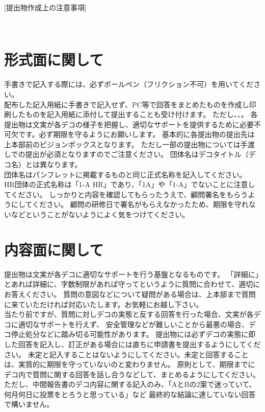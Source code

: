 \newpage
\pagestyle{booklet}
[提出物作成上の注意事項]
\begin{multicols*}{2}
　\\
\vspace{-15mm}
\section{形式面に関して}
\indent 手書きで記入する際には、必ずボールペン（フリクション不可）を用いてください。\\
\indent 配布した記入用紙に手書きで記入せず、PC等で回答をまとめたものを作成し印刷したものを記入用紙に添付して提出することも受け付けます。
ただし、、。
\indent 各提出物は文実が各デコの様子を把握し、適切なサポートを提供するために必要不可欠です。必ず期限を守るようにお願いします。
\indent 基本的に各提出物の提出先は上本部前のピジョンボックスとなります。
ただし一部の提出物については手渡しでの提出が必須となりますのでご注意ください。
\indent 団体名はデコタイトル（デコ名）とは異なります。\\
\indent 団体名はパンフレットに掲載するものと同じ正式名称を記入してください。\\
HR団体の正式名称は「1-A HR」であり、「1A」や「1-A」でないことに注意してください。
\indent しっかりと内容を確認してもらったうえで、顧問署名をもらうようにしてください。
顧問の研修日で署名がもらえなかったため、期限を守れないなどということがないようによく気をつけてください。

\section{内容面に関して}
\indent 提出物は文実が各デコに適切なサポートを行う基盤となるものです。
「詳細に」とあれば詳細に、字数制限があれば守ってというように質問に合わせて、適切にお答えください。
質問の意図などについて疑問がある場合は、上本部まで質問に来ていただければ対応いたします。お気軽にお越し下さい。\\
\indent 当たり前ですが、質問に対しデコの実態と反する回答を行った場合、文実が各デコに適切なサポートを行えず、
安全管理などが難しいことから最悪の場合、デコ停止処分などに踏み切る可能性があります。
提出物には必ずデコの実態に即した回答を記入し、訂正がある場合には直ちに申請書を提出するようにしてください。
\indent 未定と記入することはないようにしてください。未定と回答することは、実質的に期限を守っていないのと変わりません。
原則として、期限までにデコ内で質問に関する回答を話し合うなどして、まとめるようにしてください。
ただし、中間報告書のデコ内容に関する記入のみ、「AとBの2案で迷っていて、何月何日に投票をとろうと思っている」など
最終的な結論に達していない回答で構いません。


\end{multicols*}
